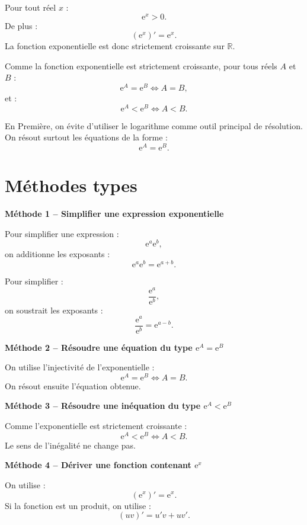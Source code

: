 \documentclass[11pt,a4paper]{article}
\newcommand{\R}{\mathbb{R}}
\newcommand{\e}{\mathrm{e}}
\begin{document}
\begin{rappelbox}
Pour tout réel $x$ :
\[
\e^x>0.
\]
De plus :
\[
(\e^x)'=\e^x.
\]
La fonction exponentielle est donc strictement croissante sur $\R$.
\end{rappelbox}

\begin{rappelbox}
Comme la fonction exponentielle est strictement croissante, pour tous réels $A$ et $B$ :
\[
\e^A=\e^B \Longleftrightarrow A=B,
\]
et :
\[
\e^A<\e^B \Longleftrightarrow A<B.
\]
\end{rappelbox}

\begin{attentionbox}
En Première, on évite d'utiliser le logarithme comme outil principal de résolution. On résout surtout les équations de la forme :
\[
\e^A=\e^B.
\]
\end{attentionbox}

\section{Méthodes types}

\begin{methodebox}
\textbf{Méthode 1 -- Simplifier une expression exponentielle}

Pour simplifier une expression :
\[
\e^a\e^b,
\]
on additionne les exposants :
\[
\e^a\e^b=\e^{a+b}.
\]

Pour simplifier :
\[
\frac{\e^a}{\e^b},
\]
on soustrait les exposants :
\[
\frac{\e^a}{\e^b}=\e^{a-b}.
\]
\end{methodebox}

\begin{methodebox}
\textbf{Méthode 2 -- Résoudre une équation du type $\e^A=\e^B$}

On utilise l'injectivité de l'exponentielle :
\[
\e^A=\e^B \Longleftrightarrow A=B.
\]
On résout ensuite l'équation obtenue.
\end{methodebox}

\begin{methodebox}
\textbf{Méthode 3 -- Résoudre une inéquation du type $\e^A<\e^B$}

Comme l'exponentielle est strictement croissante :
\[
\e^A<\e^B \Longleftrightarrow A<B.
\]
Le sens de l'inégalité ne change pas.
\end{methodebox}

\begin{methodebox}
\textbf{Méthode 4 -- Dériver une fonction contenant $\e^x$}

On utilise :
\[
(\e^x)'=\e^x.
\]
Si la fonction est un produit, on utilise :
\[
(uv)'=u'v+uv'.
\]
\end{methodebox}
\end{document}
